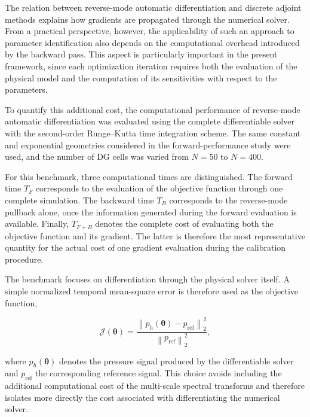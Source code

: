 \documentclass[11pt,a4paper]{report}
\theoremstyle{plain}
\theoremstyle{definition}
\begin{document}
The relation between reverse-mode automatic differentiation and discrete
adjoint methods explains how gradients are propagated through the numerical
solver. From a practical perspective, however, the applicability of such an
approach to parameter identification also depends on the computational
overhead introduced by the backward pass. This aspect is particularly
important in the present framework, since each optimization iteration requires
both the evaluation of the physical model and the computation of its
sensitivities with respect to the parameters.

To quantify this additional cost, the computational performance of
reverse-mode automatic differentiation was evaluated using the complete
differentiable solver with the second-order Runge--Kutta time integration
scheme. The same constant and exponential geometries considered in the
forward-performance study were used, and the number of DG cells was varied
from $N=50$ to $N=400$.

For this benchmark, three computational times are distinguished. The forward
time $T_F$ corresponds to the evaluation of the objective function through one
complete simulation. The backward time $T_B$ corresponds to the reverse-mode
pullback alone, once the information generated during the forward evaluation
is available. Finally, $T_{F+B}$ denotes the complete cost of evaluating both
the objective function and its gradient. The latter is therefore the most
representative quantity for the actual cost of one gradient evaluation during
the calibration procedure.

The benchmark focuses on differentiation through the physical solver itself.
A simple normalized temporal mean-square error is therefore used as the
objective function,

\begin{equation}
    \mathcal{J}(\boldsymbol{\theta})
    =
    \frac{
        \left\|
        p_h(\boldsymbol{\theta}) - p_{\mathrm{ref}}
        \right\|_2^2
    }{
        \left\|
        p_{\mathrm{ref}}
        \right\|_2^2
    },
\end{equation}

where $p_h(\boldsymbol{\theta})$ denotes the pressure signal produced by the
differentiable solver and $p_{\mathrm{ref}}$ the corresponding reference
signal. This choice avoids including the additional computational cost of the
multi-scale spectral transforms and therefore isolates more directly the cost
associated with differentiating the numerical solver.
\end{document}

